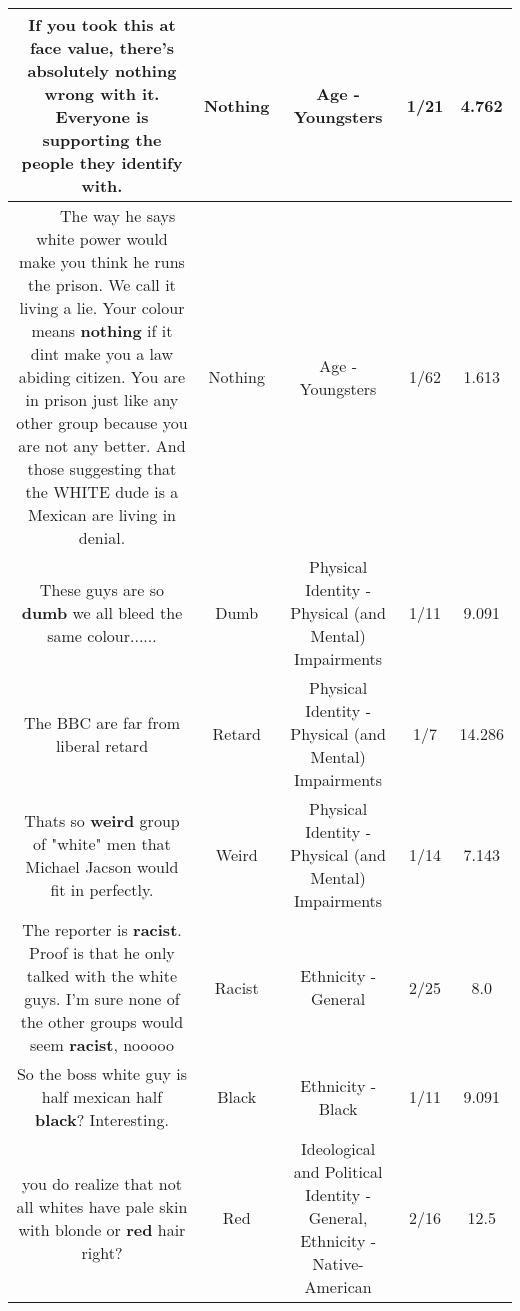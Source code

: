 \documentclass[11pt]{article}
\newlength\mylength
\begin{document}
\begin{center}
\begin{longtable}{|C{.65\mylength}|C{.30\mylength}|C{.12\mylength}|C{.12\mylength}|C{.12\mylength}|}
  \small If you took this at face value, there's absolutely \textbf{nothing} wrong with it. Everyone is supporting the people they identify with.\normalsize   & Nothing & Age - Youngsters & 1/21 & 4.762 \\  \hline
  \small 🤣🤣🤣🤣😂😂😂The way he says white power would make you think he runs the prison. We call it living a lie. Your colour means \textbf{nothing} if it dint make you a law abiding citizen. You are in prison just like any other group because you are not any better. And those suggesting that the WHITE dude is a Mexican are living in denial.\normalsize   & Nothing & Age - Youngsters & 1/62 & 1.613 \\  \hline
  \small These guys are so \textbf{dumb} we all bleed the same colour......\normalsize   & Dumb & Physical Identity - Physical (and Mental) Impairments & 1/11 & 9.091 \\  \hline
  \small The BBC are far from liberal retard\normalsize   & Retard & Physical Identity - Physical (and Mental) Impairments & 1/7 & 14.286 \\  \hline
  \small Thats so \textbf{weird} group of "white" men that Michael Jacson would fit in perfectly.\normalsize   & Weird & Physical Identity - Physical (and Mental) Impairments & 1/14 & 7.143 \\  \hline
  \small The reporter is \textbf{racist}. Proof is that he only talked with the white guys. I'm sure none of the other groups would seem \textbf{racist}, nooooo\normalsize   & Racist & Ethnicity - General & 2/25 & 8.0 \\  \hline
  \small So the boss white guy is half mexican half \textbf{black}? Interesting.\normalsize   & Black & Ethnicity - Black & 1/11 & 9.091 \\  \hline
  \small you do realize that not all whites have pale skin with blonde or \textbf{r\textbf{ed}} hair right?\normalsize   & Red &  Ideological and Political Identity - General, Ethnicity - Native-American & 2/16 & 12.5 \\  \hline

\end{longtable}
\end{center}
\end{document}
